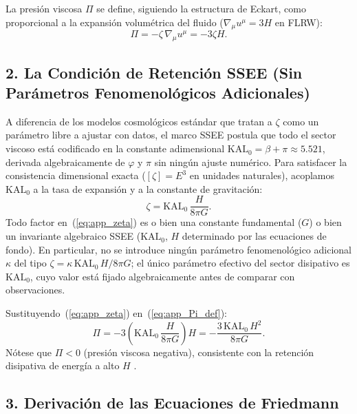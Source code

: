 La presión viscosa $\Pi$ se define, siguiendo la estructura de Eckart,
como proporcional a la expansión volumétrica del fluido
($\nabla_{\!\mu}u^{\mu} = 3H$ en FLRW):
%
\begin{equation}
  \Pi = -\zeta\,\nabla_{\!\mu}u^{\mu} = -3\zeta H.
  \label{eq:app_Pi_def}
\end{equation}

\subsection*{2. La Condición de Retención SSEE (Sin Parámetros Fenomenológicos Adicionales)}

A diferencia de los modelos cosmológicos estándar que tratan a $\zeta$ como
un parámetro libre a ajustar con datos, el marco SSEE postula que todo el
sector viscoso está codificado en la constante adimensional
$\mathrm{KAL}_{0} = \beta + \pi \approx 5.521$, derivada algebraicamente
de $\varphi$ y $\pi$ sin ningún ajuste numérico.
Para satisfacer la consistencia dimensional exacta
($[\zeta] = E^{3}$ en unidades naturales), acoplamos $\mathrm{KAL}_{0}$
a la tasa de expansión y a la constante de gravitación:
%
\begin{equation}
  \zeta = \mathrm{KAL}_{0}\,\frac{H}{8\pi G}.
  \label{eq:app_zeta}
\end{equation}
%
Todo factor en~(\ref{eq:app_zeta}) es o bien una constante fundamental ($G$)
o bien un invariante algebraico SSEE ($\mathrm{KAL}_{0}$, $H$ determinado
por las ecuaciones de fondo).
En particular, no se introduce ningún parámetro fenomenológico adicional
$\kappa$ del tipo $\zeta = \kappa\,\mathrm{KAL}_{0}\,H/8\pi G$;
el único parámetro efectivo del sector disipativo es $\mathrm{KAL}_{0}$,
cuyo valor está fijado algebraicamente antes de comparar con observaciones.

Sustituyendo~(\ref{eq:app_zeta}) en~(\ref{eq:app_Pi_def}):
%
\begin{equation}
  \Pi
    = -3\!\left(\mathrm{KAL}_{0}\,\frac{H}{8\pi G}\right)\!H
    = -\frac{3\,\mathrm{KAL}_{0}\,H^{2}}{8\pi G}.
  \label{eq:app_Pi}
\end{equation}
%
Nótese que $\Pi < 0$ (presión viscosa negativa), consistente con la
retención disipativa de energía a alto $H$ \citep{Weinberg1971, Brevik2005}.

\subsection*{3. Derivación de las Ecuaciones de Friedmann}

